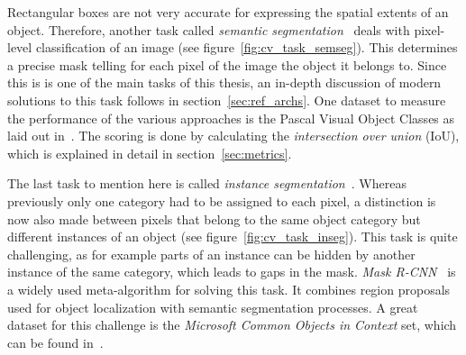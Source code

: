 Rectangular boxes are not very accurate for expressing the spatial extents of an object. Therefore, another task called \emph{semantic segmentation}~\cite{weakseg15} deals with pixel-level classification of an image (see figure~\ref{fig:cv_task_semseg}). This determines a precise mask telling for each pixel of the image the object it belongs to. Since this is is one of the main tasks of this thesis, an in-depth discussion of modern solutions to this task follows in section~\ref{sec:ref_archs}. One dataset to measure the performance of the various approaches is the Pascal Visual Object Classes as laid out in~\cite{pascal_voc15}. The scoring is done by calculating the \emph{intersection over union} (IoU), which is explained in detail in section~\ref{sec:metrics}.

The last task to mention here is called \emph{instance segmentation}~\cite{mask-rcnn14}. Whereas previously only one category had to be assigned to each pixel, a distinction is now also made between pixels that belong to the same object category but different instances of an object (see figure~\ref{fig:cv_task_inseg}). This task is quite challenging, as for example parts of an instance can be hidden by another instance of the same category, which leads to gaps in the mask. \emph{Mask R-CNN}~\cite{mask-rcnn14} is a widely used meta-algorithm for solving this task. It combines region proposals used for object localization with semantic segmentation processes. A great dataset for this challenge is the \emph{Microsoft Common Objects in Context} set, which can be found in~\cite{coco15}.

